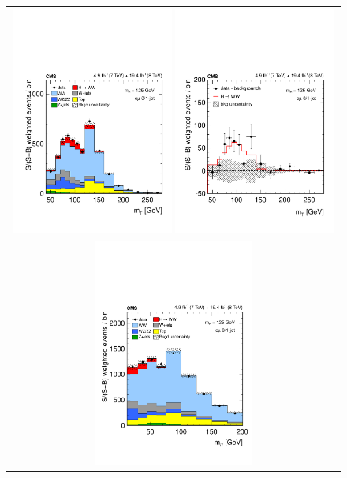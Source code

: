 \begin{figure}[htp] 
\centering 
\begin{tabular}{c} 
\includegraphics[width=0.49\textwidth]{figures/st_mT_1dweight.pdf}
\includegraphics[width=0.49\textwidth]{figures/dataminusbkg_mT_1dweight.pdf} 
\\
\includegraphics[width=0.49\textwidth]{figures/st_mll_1dweight.pdf}

\end{tabular}
\end{figure}
